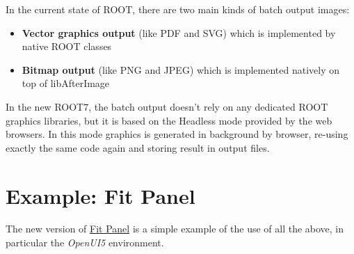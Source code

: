 \documentclass[a4paper]{jpconf}
\begin{document}
In the current state of ROOT, there are two main kinds of batch output images:
\begin{itemize}
  \item \textbf{Vector graphics output} (like PDF and SVG) which is implemented by native ROOT classes
  \item \textbf{Bitmap output} (like PNG and JPEG) which is implemented natively on top of libAfterImage
\end{itemize}

In the new ROOT7,  the batch output doesn't rely on any dedicated ROOT graphics
libraries, but it is based on the \textit{}{Headless mode} provided by the web
browsers. In this mode graphics is generated in background by browser, re-using exactly the same code again and storing result in output files. 

\section{Example: Fit Panel}

The new version of \href{https://root.cern.ch/fit-panel}{Fit Panel} is a simple
example of the use of all the above, in particular the \textit{OpenUI5} environment.
\end{document}

